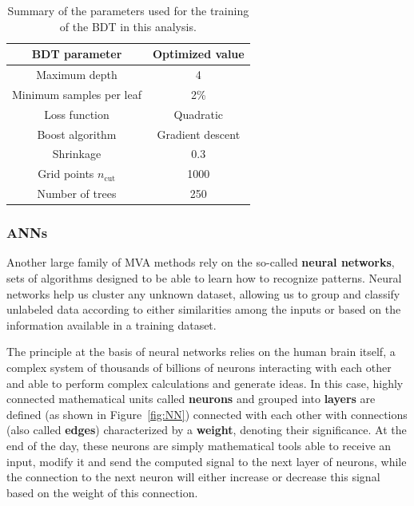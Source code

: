 \documentclass[a4paper, 10pt, openright]{report}
\begin{document}
\begin{table}
\begin{center}
\begin{tabular}{ c|c } 
\hline
 BDT parameter & Optimized value \\
 \hline
 Maximum depth & 4 \\
 Minimum samples per leaf & 2\% \\
 Loss function & Quadratic \\
 Boost algorithm & Gradient descent \\
 Shrinkage & 0.3 \\
 Grid points $n_{\text{cut}}$ & 1000 \\
 Number of trees & 250 \\
\hline
\end{tabular}
\caption{Summary of the parameters used for the training of the \ac{BDT} in this analysis.}
\label{table:BDT}
\end{center}
\end{table}

\subsubsection{\acfp{ANN}}\label{section:DNN}

Another large family of \ac{MVA} methods rely on the so-called \textbf{neural networks}, sets of algorithms designed to be able to learn how to recognize patterns. Neural networks help us cluster any unknown dataset, allowing us to group and classify unlabeled data according to either similarities among the inputs or based on the information available in a training dataset.

The principle at the basis of neural networks relies on the human brain itself, a complex system of thousands of billions of neurons interacting with each other and able to perform complex calculations and generate ideas. In this case, highly connected mathematical units called \textbf{neurons} and grouped into \textbf{layers} are defined (as shown in Figure~\ref{fig:NN}) connected with each other with connections (also called \textbf{edges}) characterized by a \textbf{weight}, denoting their significance. At the end of the day, these neurons are simply mathematical tools able to receive an input, modify it and send the computed signal to the next layer of neurons, while the connection to the next neuron will either increase or decrease this signal based on the weight of this connection.
\end{document}
